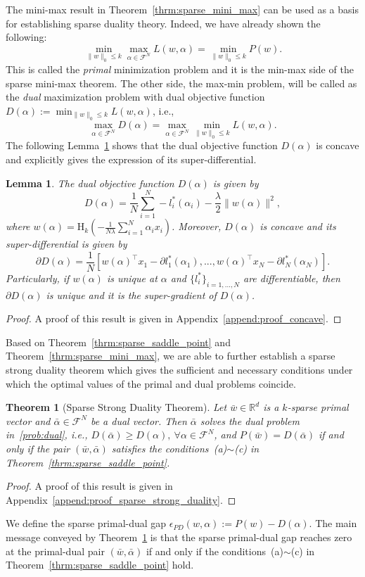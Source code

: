 \documentclass[11pt]{article}
\newtheorem{lemma}{Lemma}
\newtheorem{theorem}{Theorem}
\numberwithin{equation}{section}
\numberwithin{table}{section}
\numberwithin{figure}{section}
\begin{document}
The mini-max result in Theorem~\ref{thrm:sparse_mini_max} can be used as a basis for establishing sparse duality theory. Indeed, we have already shown the following:
\[
\min_{\|w\|_0 \le k}\max_{\alpha \in \mathcal{F}^N} L(w,\alpha) = \min_{\|w\|_0\le k} P(w).
\]
This is called the \emph{primal} minimization problem and it is the min-max side of the sparse mini-max theorem. The other side, the max-min problem, will be called as the \emph{dual} maximization problem with dual objective function $D(\alpha):=\min_{\|w\|_0 \le k} L(w, \alpha)$, i.e.,
\begin{equation}\label{prob:dual}
\max_{\alpha \in \mathcal{F}^N}D(\alpha)=\max_{\alpha \in \mathcal{F}^N}\min_{\|w\|_0 \le k} L(w, \alpha).
\end{equation}
The following Lemma~\ref{lemma:concave} shows that the dual objective function $D(\alpha)$ is concave and explicitly gives the expression of its super-differential.
\begin{lemma}\label{lemma:concave}
The dual objective function $D(\alpha)$ is given by
\[
D(\alpha)= \frac{1}{N}\sum_{i=1}^N - l^*_i(\alpha_i) - \frac{\lambda}{2}\|w(\alpha)\|^2,
\]
where $ w(\alpha) = \mathrm{H}_k\left(-\frac{1}{N\lambda} \sum_{i=1}^N \alpha_i x_i \right)$.
Moreover, $D(\alpha)$ is concave and its super-differential is given by
\[
\partial D(\alpha) = \frac{1}{N} [w(\alpha)^\top x_1 - \partial l^*_1(\alpha_1),...,w(\alpha)^\top x_N - \partial l^*_N(\alpha_N)].
\]
Particularly, if $w(\alpha)$ is unique at $\alpha$ and $\{l^*_i\}_{i=1,...,N}$ are differentiable, then $\partial D(\alpha)$ is unique and it is the super-gradient of $D(\alpha)$.
\end{lemma}
\begin{proof}
A proof of this result is given in Appendix~\ref{append:proof_concave}.
\end{proof}
Based on Theorem~\ref{thrm:sparse_saddle_point} and Theorem~\ref{thrm:sparse_mini_max}, we are able to further establish a sparse strong duality theorem which gives the sufficient and necessary conditions under which the optimal values of the primal and dual problems coincide.
\begin{theorem}[Sparse Strong Duality Theorem]\label{thrm:sparse_strong_duality}
Let $\bar w \in \mathbb{R}^d$ is a $k$-sparse primal vector and $\bar \alpha \in \mathcal{F}^N$ be a dual vector. Then $\bar \alpha$ solves the dual problem in~\eqref{prob:dual}, i.e., $D(\bar\alpha) \ge D(\alpha), \ \forall \alpha \in \mathcal{F}^N$, and $P(\bar w) = D(\bar\alpha)$ if and only if the pair $(\bar w, \bar\alpha)$ satisfies the conditions~(a)$\sim$(c) in Theorem~\ref{thrm:sparse_saddle_point}.
\end{theorem}
\begin{proof}
A proof of this result is given in Appendix~\ref{append:proof_sparse_strong_duality}.
\end{proof}
We define the sparse primal-dual gap $\epsilon_{PD}(w,\alpha):=P(w) - D(\alpha)$. The main message conveyed by Theorem~\ref{thrm:sparse_strong_duality} is that the sparse primal-dual gap reaches zero at the primal-dual pair $(\bar w, \bar \alpha)$ if and only if the conditions~(a)$\sim$(c) in Theorem~\ref{thrm:sparse_saddle_point} hold.
\end{document}
